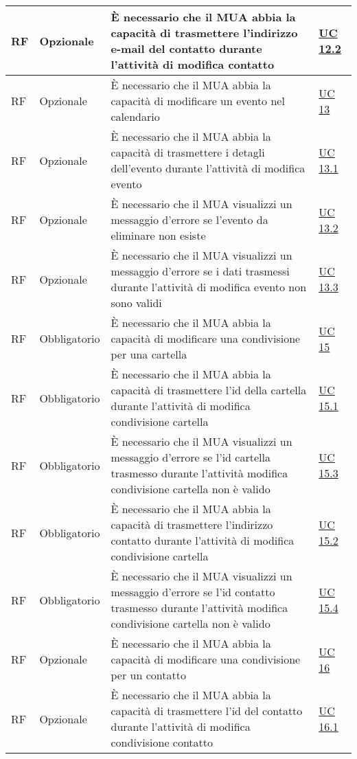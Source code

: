\begin{longtable}{*{1}{>{\centering\arraybackslash}p{1.5cm}}*{1}{>{\centering\arraybackslash}p{2.5cm}}p{6cm}*{1}{>{\centering\arraybackslash}p{3cm}}}
    \\\hline
    RF & Opzionale & È necessario che il MUA abbia la capacità di trasmettere l'indirizzo e-mail del contatto durante l'attività di modifica contatto & \hyperref[sec:UC12.2]{UC 12.2}
    \\\hline
    RF & Opzionale & È necessario che il MUA abbia la capacità di modificare un evento nel calendario & \hyperref[sec:UC13]{UC 13}
    \\\hline
    RF & Opzionale & È necessario che il MUA abbia la capacità di trasmettere i detagli dell'evento durante l'attività di modifica evento & \hyperref[sec:UC13.1]{UC 13.1}
    \\\hline
    RF & Opzionale & È necessario che il MUA visualizzi un messaggio d'errore se l'evento da eliminare non esiste & \hyperref[sec:UC13.2]{UC 13.2}
    \\\hline
    RF & Opzionale & È necessario che il MUA visualizzi un messaggio d'errore se i dati trasmessi durante l'attività di modifica evento non sono validi & \hyperref[sec:UC13.3]{UC 13.3}
    \\\hline
    RF & Obbligatorio & È necessario che il MUA abbia la capacità di modificare una condivisione per una cartella & \hyperref[sec:UC15]{UC 15}
    \\\hline
    RF & Obbligatorio & È necessario che il MUA abbia la capacità di trasmettere l'id della cartella durante l'attività di modifica condivisione cartella & \hyperref[sec:UC15.1]{UC 15.1}
    \\\hline
    RF & Obbligatorio & È necessario che il MUA visualizzi un messaggio d'errore se l'id cartella trasmesso durante l'attività modifica condivisione cartella non è valido & \hyperref[sec:UC15.3]{UC 15.3}
    \\\hline
    RF & Obbligatorio & È necessario che il MUA abbia la capacità di trasmettere l'indirizzo contatto durante l'attività di modifica condivisione cartella & \hyperref[sec:UC15.2]{UC 15.2}
    \\\hline
    RF & Obbligatorio & È necessario che il MUA visualizzi un messaggio d'errore se l'id contatto trasmesso durante l'attività modifica condivisione cartella non è valido & \hyperref[sec:UC15.4]{UC 15.4}
    \\\hline
    RF & Opzionale & È necessario che il MUA abbia la capacità di modificare una condivisione per un contatto & \hyperref[sec:UC16]{UC 16}
    \\\hline
    RF & Opzionale & È necessario che il MUA abbia la capacità di trasmettere l'id del contatto durante l'attività di modifica condivisione contatto & \hyperref[sec:UC16.1]{UC 16.1}

\end{longtable}
